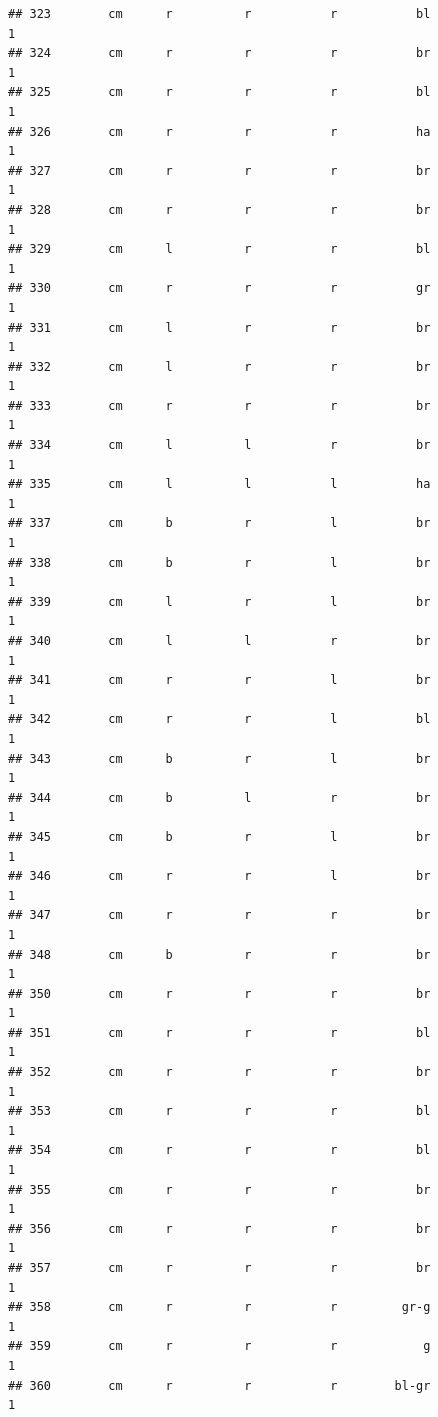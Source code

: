 \documentclass[]{article}
\begin{document}
\begin{verbatim}
## 323        cm      r          r           r           bl             1
## 324        cm      r          r           r           br             1
## 325        cm      r          r           r           bl             1
## 326        cm      r          r           r           ha             1
## 327        cm      r          r           r           br             1
## 328        cm      r          r           r           br             1
## 329        cm      l          r           r           bl             1
## 330        cm      r          r           r           gr             1
## 331        cm      l          r           r           br             1
## 332        cm      l          r           r           br             1
## 333        cm      r          r           r           br             1
## 334        cm      l          l           r           br             1
## 335        cm      l          l           l           ha             1
## 337        cm      b          r           l           br             1
## 338        cm      b          r           l           br             1
## 339        cm      l          r           l           br             1
## 340        cm      l          l           r           br             1
## 341        cm      r          r           l           br             1
## 342        cm      r          r           l           bl             1
## 343        cm      b          r           l           br             1
## 344        cm      b          l           r           br             1
## 345        cm      b          r           l           br             1
## 346        cm      r          r           l           br             1
## 347        cm      r          r           r           br             1
## 348        cm      b          r           r           br             1
## 350        cm      r          r           r           br             1
## 351        cm      r          r           r           bl             1
## 352        cm      r          r           r           br             1
## 353        cm      r          r           r           bl             1
## 354        cm      r          r           r           bl             1
## 355        cm      r          r           r           br             1
## 356        cm      r          r           r           br             1
## 357        cm      r          r           r           br             1
## 358        cm      r          r           r         gr-g             1
## 359        cm      r          r           r            g             1
## 360        cm      r          r           r        bl-gr             1

\end{verbatim}
\end{document}
